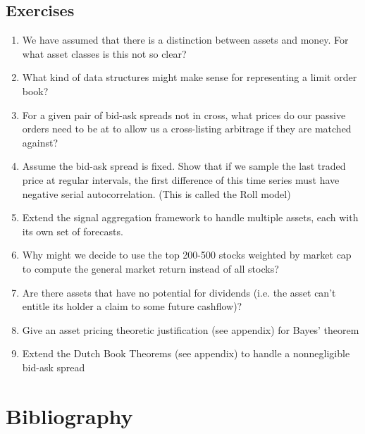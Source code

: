 \documentclass{article}
\begin{document}
\subsection{Exercises}
\begin{enumerate}
	\item We have assumed that there is a distinction between assets and money. For what asset classes is this not so clear?
	\item What kind of data structures might make sense for representing a limit order book?
	\item For a given pair of bid-ask spreads not in cross, what prices do our passive orders need to be at to allow us a cross-listing arbitrage if they are matched against?
	\item Assume the bid-ask spread is fixed. Show that if we sample the last traded price at regular intervals, the first difference of this time series must have negative serial autocorrelation. (This is called the Roll model)
	\item Extend the signal aggregation framework to handle multiple assets, each with its own set of forecasts.
\end{enumerate}
\begin{enumerate}
	\setcounter{enumi}{5}
	\item Why might we decide to use the top 200-500 stocks weighted by market cap to compute the general market return instead of all stocks?
	\item Are there assets that have no potential for dividends (i.e. the asset can't entitle its holder a claim to some future cashflow)?
	\item Give an asset pricing theoretic justification (see appendix) for Bayes' theorem
	\item Extend the Dutch Book Theorems (see appendix) to handle a nonnegligible bid-ask spread
\end{enumerate}

\section{Bibliography}
\end{document}
